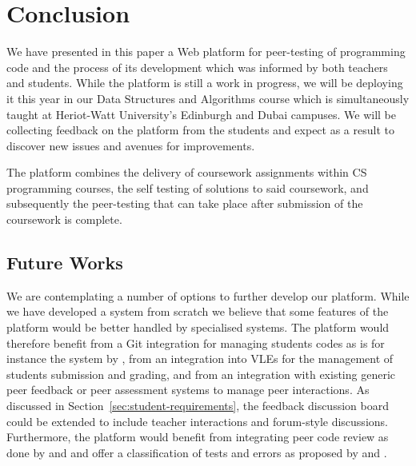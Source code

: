 \documentclass[sigplan,10pt,review]{acmart}\settopmatter{printfolios=true}
\begin{document}
\section{Conclusion}
\label{sec:conclusion}


We have presented in this paper a Web platform for peer-testing of
programming code and the process of its development which was informed
by both teachers and students. While the platform is still a work in
progress, we will be deploying it this year in our Data Structures and
Algorithms course which is simultaneously taught at Heriot-Watt
University's Edinburgh and Dubai campuses. We will be collecting
feedback on the platform from the students and expect as a result to
discover new issues and avenues for improvements.

The platform combines the delivery of coursework assignments within
\ac{CS} programming courses, the self testing of solutions to said
coursework, and subsequently the peer-testing that can take place
after submission of the coursework is complete.

\subsection{Future Works}

We are contemplating a number of options to further develop our
platform. While we have developed a system from scratch we believe
that some features of the platform would be better handled by
specialised systems. The platform would therefore benefit from a Git
integration for managing students codes as is for instance the system
by \citet{Rue+Hic+Par+Lev+Mem+Pla+Mar_CCS-2016}, from an integration
into \acp{VLE} for the management of students submission and grading,
and from an integration with existing generic peer feedback or peer
assessment systems to manage peer interactions. As discussed in
Section~\ref{sec:student-requirements}, the feedback discussion board
could be extended to include teacher interactions and forum-style
discussions. Furthermore, the platform would benefit from integrating
peer code review
as done by \citet{Trytten_SIGSE-2005} and \citet{HunAgrAgr_TOCE-2013}
and offer a classification of tests and errors as
proposed by \citep{SonMul_CSE-2012-v22n4} and
\citep{ReiFinTer_Group-2009}.
\end{document}
